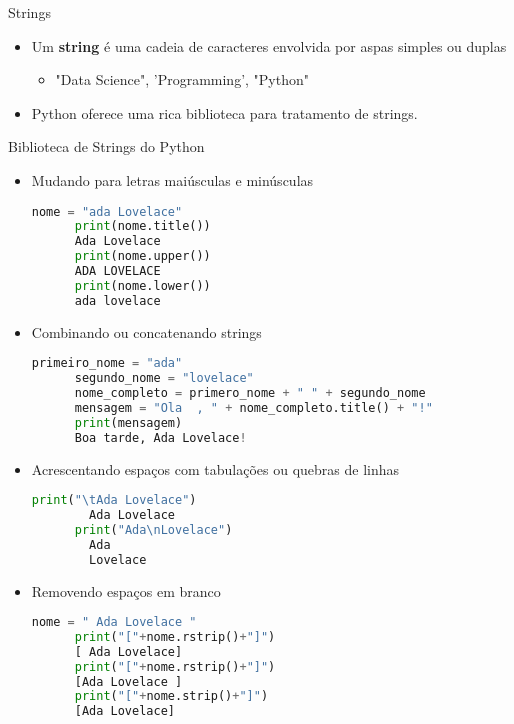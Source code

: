 \begin{frame}{Strings}
  \begin{itemize}
    \item Um {\bf string} é uma cadeia de caracteres envolvida por aspas simples ou duplas
    \begin{itemize}
      \item "Data Science", 'Programming', "Python"
    \end{itemize}
    \item Python oferece uma rica biblioteca para tratamento de strings.
  \end{itemize}
\end{frame}
%
\begin{frame}{Biblioteca de Strings do Python}
   \begin{itemize}
    \item Mudando para letras maiúsculas e minúsculas
    \begin{lstlisting}[language=python]
      nome = "ada Lovelace"
      print(nome.title())
      Ada Lovelace
      print(nome.upper())
      ADA LOVELACE
      print(nome.lower())
      ada lovelace
    \end{lstlisting}
    \pagebreak
    \item Combinando ou concatenando strings
    \begin{lstlisting}[language=python]
      primeiro_nome = "ada"
      segundo_nome = "lovelace"
      nome_completo = primero_nome + " " + segundo_nome
      mensagem = "Ola  , " + nome_completo.title() + "!"
      print(mensagem)
      Boa tarde, Ada Lovelace!
    \end{lstlisting}
    \item Acrescentando espaços com tabulações ou quebras de linhas
    \begin{lstlisting}[language=python]
      print("\tAda Lovelace")
        Ada Lovelace
      print("Ada\nLovelace")
        Ada
        Lovelace
    \end{lstlisting}
    \pagebreak
    \item Removendo espaços em branco
    \begin{lstlisting}[language=python]
      nome = " Ada Lovelace " 
      print("["+nome.rstrip()+"]")
      [ Ada Lovelace]
      print("["+nome.rstrip()+"]")
      [Ada Lovelace ]
      print("["+nome.strip()+"]")
      [Ada Lovelace]
    \end{lstlisting}
  \end{itemize}
\end{frame}

 